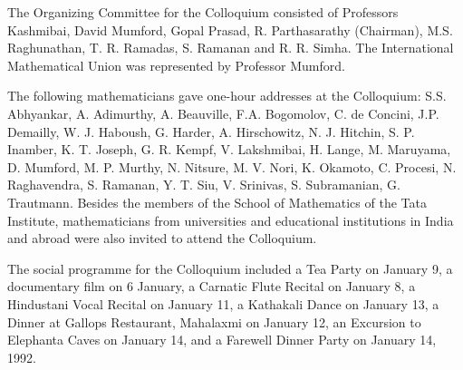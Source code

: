The Organizing Committee for the Colloquium consisted of Professors Kashmibai, David Mumford, Gopal Prasad, R. Parthasarathy (Chairman), M.S. Raghunathan, T. R. Ramadas, S. Ramanan and R. R. Simha. The International Mathematical Union was represented by Professor Mumford.

The following mathematicians gave one-hour addresses at the Colloquium: S.S. Abhyankar, A. Adimurthy, A. Beauville, F.A. Bogomolov, C. de Concini, J.P. Demailly, W. J. Haboush, G. Harder, A. Hirschowitz, N. J. Hitchin, S. P. Inamber, K. T. Joseph, G. R. Kempf, V. Lakshmibai, H. Lange, M. Maruyama, D. Mumford, M. P. Murthy, N. Nitsure, M. V. Nori, K. Okamoto, C. Procesi, N. Raghavendra, S. Ramanan, Y. T. Siu, V. Srinivas, S. Subramanian, G. Trautmann. Besides the members of the School of Mathematics of the Tata Institute, mathematicians from universities and educational institutions in India and abroad were also invited to attend the Colloquium.

The social programme for the Colloquium included a Tea Party on January 9, a documentary film on 6 January, a Carnatic Flute Recital on January 8, a Hindustani Vocal Recital on January 11, a Kathakali Dance on January 13, a Dinner at Gallops Restaurant, Mahalaxmi on January 12, an Excursion to Elephanta Caves on January 14, and a Farewell Dinner Party on January 14, 1992.
